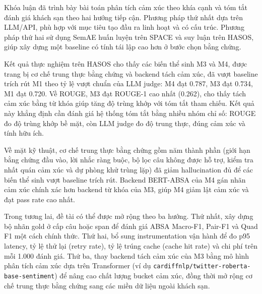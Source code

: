 \documentclass[12pt,a4paper]{report}
\begin{document}
Khóa luận đã trình bày bài toán phân tích cảm xúc theo khía cạnh và tóm tắt đánh giá khách sạn theo hai hướng tiếp cận. Phương pháp thứ nhất dựa trên LLM/API, phù hợp với mục tiêu tạo đầu ra linh hoạt và có cấu trúc. Phương pháp thứ hai sử dụng SemAE huấn luyện trên SPACE và suy luận trên HASOS, giúp xây dựng một baseline có tính tái lập cao hơn ở bước chọn bằng chứng.

Kết quả thực nghiệm trên HASOS cho thấy các biến thể sinh M3 và M4, được trang bị cơ chế trung thực bằng chứng và backend tách cảm xúc, đã vượt baseline trích rút M1 theo tỷ lệ vượt chuẩn của LLM judge: M4 đạt \num{0.787}, M3 đạt \num{0.734}, M1 đạt \num{0.720}. Về ROUGE, M3 đạt ROUGE-1 cao nhất (\num{0.262}), cho thấy tách cảm xúc bằng từ khóa giúp tăng độ trùng khớp với tóm tắt tham chiếu. Kết quả này khẳng định cần đánh giá hệ thống tóm tắt bằng nhiều nhóm chỉ số: ROUGE đo độ trùng khớp bề mặt, còn LLM judge đo độ trung thực, đúng cảm xúc và tính hữu ích.

Về mặt kỹ thuật, cơ chế trung thực bằng chứng gồm năm thành phần (giới hạn bằng chứng đầu vào, lời nhắc ràng buộc, bộ lọc câu không được hỗ trợ, kiểm tra nhất quán cảm xúc và dự phòng khử trùng lặp) đã giảm hallucination đủ để các biến thể sinh vượt baseline trích rút. Backend BERT-ABSA của M4 gán nhãn cảm xúc chính xác hơn backend từ khóa của M3, giúp M4 giảm lật cảm xúc và đạt pass rate cao nhất.

Trong tương lai, đề tài có thể được mở rộng theo ba hướng. Thứ nhất, xây dựng bộ nhãn gold ở cấp câu hoặc span để đánh giá ABSA Macro-F1, Pair-F1 và Quad F1 một cách chính thức. Thứ hai, bổ sung instrumentation vận hành để đo p95 latency, tỷ lệ thử lại (retry rate), tỷ lệ trúng cache (cache hit rate) và chi phí trên mỗi 1.000 đánh giá. Thứ ba, thay backend tách cảm xúc của M3 bằng mô hình phân tích cảm xúc dựa trên Transformer (ví dụ \texttt{cardiffnlp/twitter-roberta-base-sentiment}) để nâng cao chất lượng bucket cảm xúc, đồng thời mở rộng cơ chế trung thực bằng chứng sang các miền dữ liệu ngoài khách sạn.
\end{document}

